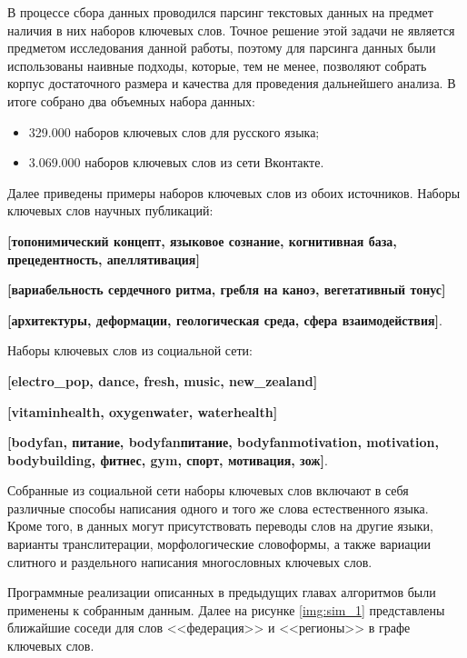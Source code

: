 В процессе сбора данных проводился парсинг текстовых данных на предмет наличия в них наборов ключевых слов. Точное решение этой задачи не является предметом исследования данной работы, поэтому для парсинга данных были использованы наивные подходы, которые, тем не менее, позволяют собрать корпус достаточного размера и качества  для проведения дальнейшего анализа.
В итоге собрано два объемных набора данных:
\begin{itemize}
    \item 329.000 наборов ключевых слов для русского языка;
    \item 3.069.000 наборов ключевых слов из сети Вконтакте.
\end{itemize}
Далее приведены примеры наборов ключевых слов из обоих источников. Наборы ключевых слов научных публикаций:

    \textbf{[топонимический концепт, языковое сознание, когнитивная база, прецедентность, апеллятивация]}\

    \textbf{[вариабельность сердечного ритма, гребля на каноэ, вегетативный тонус]}\
    
    \textbf{[архитектуры, деформации, геологическая среда, сфера взаимодействия]}.

Наборы ключевых слов из социальной сети:

    \textbf{[electro\_pop, dance, fresh, music, new\_zealand]}\

    \textbf{[vitaminhealth, oxygenwater, waterhealth]}\

    \textbf{[bodyfan, питание, bodyfanпитание, bodyfanmotivation, motivation, bodybuilding, фитнес, gym, спорт, мотивация, зож]}.

Собранные из социальной сети наборы ключевых слов включают в себя различные способы написания одного и того же слова естественного языка. Кроме того, в данных могут присутствовать переводы слов на другие языки, варианты транслитерации, морфологические словоформы, а также вариации слитного и раздельного написания многословных ключевых слов.

Программные реализации описанных в предыдущих главах алгоритмов были применены к собранным данным. Далее на рисунке \ref{img:sim_1} представлены ближайшие соседи для слов <<федерация>> и <<регионы>> в графе ключевых слов.

